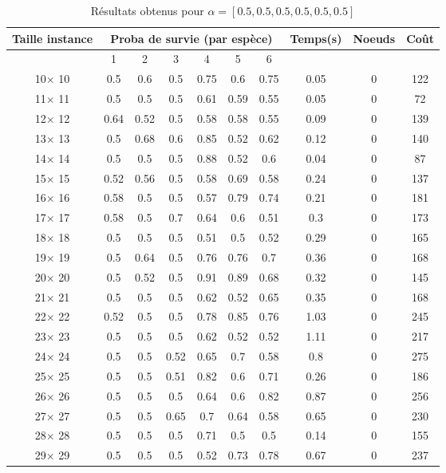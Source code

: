 \documentclass[main.tex]{subfiles}
\begin{document}
\begin{table}
    \centering
    \caption{Résultats obtenus pour $\alpha = [0.5, 0.5, 0.5, 0.5, 0.5, 0.5]$}
    \begin{tabular}{|c|c|c|c|c|c|c|c|c|c|}
	\hline
	\textbf{Taille instance} &\multicolumn{6}{c}{\textbf{Proba de survie (par espèce)}} &\textbf{Temps(s)} &\textbf{Noeuds} &\textbf{Coût}\\
	\hline
	 &1 &2 &3 &4 &5 &6 & & &\\
	\hline

10$\times$ 10 &0.5 &0.6 &0.5 &0.75 &0.6 &0.75 &0.05 &0 &122\\
11$\times$ 11 &0.5 &0.5 &0.5 &0.61 &0.59 &0.55 &0.05 &0 &72\\
12$\times$ 12 &0.64 &0.52 &0.5 &0.58 &0.58 &0.55 &0.09 &0 &139\\
13$\times$ 13 &0.5 &0.68 &0.6 &0.85 &0.52 &0.62 &0.12 &0 &140\\
14$\times$ 14 &0.5 &0.5 &0.5 &0.88 &0.52 &0.6 &0.04 &0 &87\\
15$\times$ 15 &0.52 &0.56 &0.5 &0.58 &0.69 &0.58 &0.24 &0 &137\\
16$\times$ 16 &0.58 &0.5 &0.5 &0.57 &0.79 &0.74 &0.21 &0 &181\\
17$\times$ 17 &0.58 &0.5 &0.7 &0.64 &0.6 &0.51 &0.3 &0 &173\\
18$\times$ 18 &0.5 &0.5 &0.5 &0.51 &0.5 &0.52 &0.29 &0 &165\\
19$\times$ 19 &0.5 &0.64 &0.5 &0.76 &0.76 &0.7 &0.36 &0 &168\\
20$\times$ 20 &0.5 &0.52 &0.5 &0.91 &0.89 &0.68 &0.32 &0 &145\\
21$\times$ 21 &0.5 &0.5 &0.5 &0.62 &0.52 &0.65 &0.35 &0 &168\\
22$\times$ 22 &0.52 &0.5 &0.5 &0.78 &0.85 &0.76 &1.03 &0 &245\\
23$\times$ 23 &0.5 &0.5 &0.5 &0.62 &0.52 &0.52 &1.11 &0 &217\\
24$\times$ 24 &0.5 &0.5 &0.52 &0.65 &0.7 &0.58 &0.8 &0 &275\\
25$\times$ 25 &0.5 &0.5 &0.51 &0.82 &0.6 &0.71 &0.26 &0 &186\\
26$\times$ 26 &0.5 &0.5 &0.5 &0.64 &0.6 &0.82 &0.87 &0 &256\\
27$\times$ 27 &0.5 &0.5 &0.65 &0.7 &0.64 &0.58 &0.65 &0 &230\\
28$\times$ 28 &0.5 &0.5 &0.5 &0.71 &0.5 &0.5 &0.14 &0 &155\\
29$\times$ 29 &0.5 &0.5 &0.5 &0.52 &0.73 &0.78 &0.67 &0 &237\\

\end{tabular}
\end{table}
\end{document}
